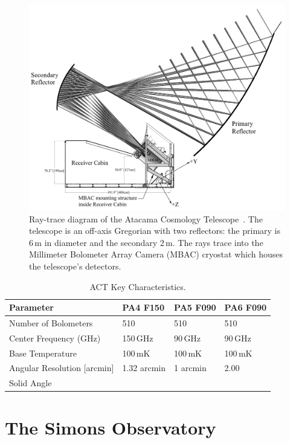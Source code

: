 \begin{figure}[t]
    \centering
    \includegraphics[width = .9\textwidth]{Figures/act_inst.pdf}
    \caption{Ray-trace diagram of the Atacama Cosmology Telescope~\cite{act_inst}.  The telescope is an off-axis Gregorian with two reflectors: the primary is 6\,m in diameter and the secondary 2\,m.  The rays trace into the Millimeter Bolometer Array Camera (MBAC) cryostat which houses the telescope's detectors.}
    \label{fig:act_inst}
\end{figure}

\begin{table}[b]
    \centering
    \begin{tabular}{|l|l|l|l|} \hline
        \textbf{ Parameter} &  \textbf{PA4 F150} &  \textbf{PA5 F090}  &  \textbf{PA6 F090}  \\ \hline \hline
        Number of Bolometers & 510 & 510 & 510\\\hline
        Center Frequency (GHz) & 150\,GHz & 90\,GHz & 90\,GHz\\\hline
        Base Temperature & 100\,mK & 100\,mK & 100\,mK\\\hline
        Angular Resolution [arcmin] &  1.32 arcmin &1 arcmin & 2.00\\\hline
        Solid Angle & & &\\\hline
    \end{tabular} \caption{ACT Key Characteristics.}
    \label{tab:act}
\end{table}
\section{The Simons Observatory}

